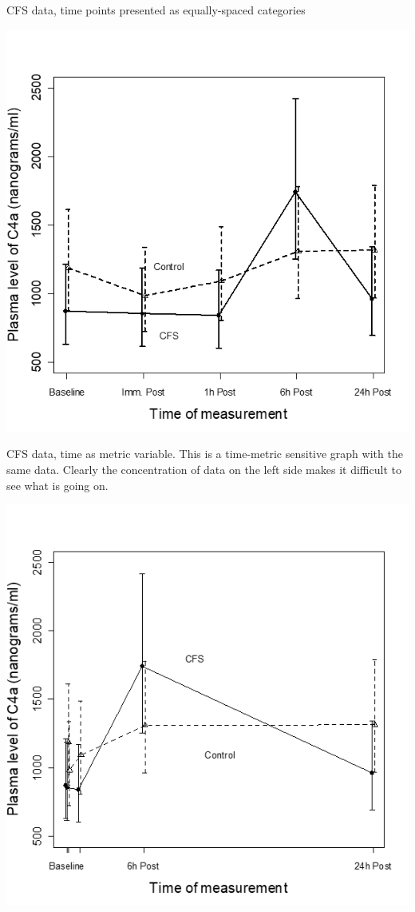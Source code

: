 \documentclass[
  9pt,
  ignorenonframetext,
]{beamer}
\begin{document}
\begin{frame}{CFS data, time points presented as equally-spaced
categories}
\protect\hypertarget{cfs-data-time-points-presented-as-equally-spaced-categories}{}
\tiny

\begin{center}\includegraphics[width=0.6\linewidth]{figs_L2/L2-f13} \end{center}

\tiny
\end{frame}

\begin{frame}{}
\protect\hypertarget{section-7}{}
CFS data, time as metric variable. This is a time-metric sensitive graph
with the same data. Clearly the concentration of data on the left side
makes it difficult to see what is going on.

\tiny

\begin{center}\includegraphics[width=0.6\linewidth]{figs_L2/L2-f14} \end{center}

\tiny
\end{frame}
\end{document}
